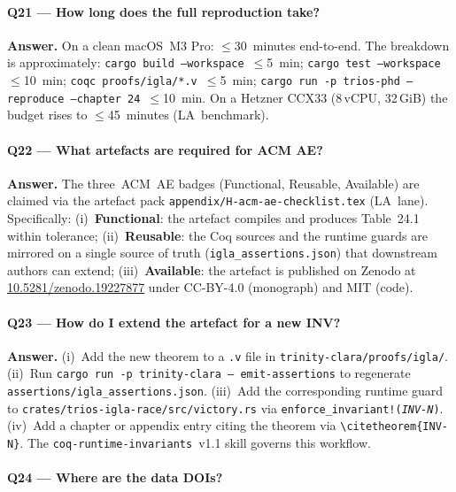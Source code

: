 \paragraph{Q21 — How long does the full reproduction take?}

\textbf{Answer.} On a clean macOS~M3 Pro: \(\le 30\)~minutes
end-to-end. The breakdown is approximately: \texttt{cargo build
--workspace}~\(\le\)5~min;
\texttt{cargo test --workspace}~\(\le\)10~min;
\texttt{coqc proofs/igla/*.v}~\(\le\)5~min;
\texttt{cargo run -p trios-phd -- reproduce --chapter 24}~\(\le\)10~min. On
a Hetzner CCX33 (8\,vCPU, 32\,GiB) the budget rises to \(\le\)45~minutes
(LA~benchmark).

\paragraph{Q22 — What artefacts are required for ACM AE?}

\textbf{Answer.} The three~ACM~AE badges (Functional, Reusable,
Available) are claimed via the artefact pack
\texttt{appendix/H-acm-ae-checklist.tex} (LA~lane). Specifically:
(i)~\textbf{Functional}: the artefact compiles and produces Table~24.1
within tolerance; (ii)~\textbf{Reusable}: the Coq sources and the
runtime guards are mirrored on a single source of truth
(\texttt{igla\_assertions.json}) that downstream authors can extend;
(iii)~\textbf{Available}: the artefact is published on Zenodo at
\href{https://doi.org/10.5281/zenodo.19227877}{10.5281/zenodo.19227877}
under CC-BY-4.0 (monograph) and MIT (code).

\paragraph{Q23 — How do I extend the artefact for a new INV?}

\textbf{Answer.} (i)~Add the new theorem to a \texttt{.v} file in
\texttt{trinity-clara/proofs/igla/}. (ii)~Run
\texttt{cargo run -p trinity-clara -- emit-assertions} to regenerate
\texttt{assertions/igla\_assertions.json}. (iii)~Add the corresponding
runtime guard to \texttt{crates/trios-igla-race/src/victory.rs} via
\texttt{enforce\_invariant!(\textit{INV-N})}. (iv)~Add a chapter or
appendix entry citing the theorem via
\texttt{\textbackslash citetheorem\{INV-N\}}. The
\texttt{coq-runtime-invariants}~v1.1 skill governs this workflow.

\paragraph{Q24 — Where are the data DOIs?}


